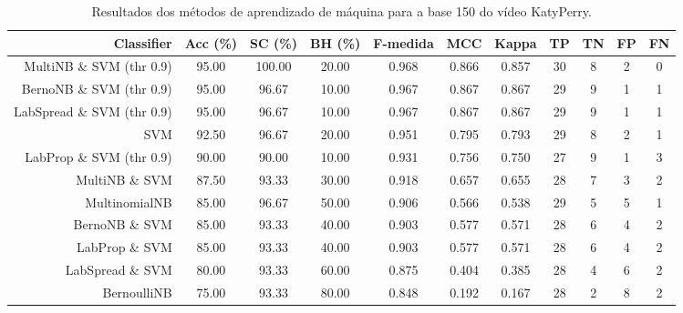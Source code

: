 \begin{table}[!htb]
\centering
\caption{Resultados dos métodos de aprendizado de máquina para a base 150 do vídeo KatyPerry.}
\label{tab:KatyPerry-150}
\begin{tabular}{r|c|c|c|c|c|c|c|c|c|c}
\hline\hline
Classifier & Acc (\%) & SC (\%) & BH (\%) & F-medida & MCC & Kappa & TP & TN & FP & FN \\ \hline
MultiNB \& SVM (thr 0.9) & 95.00 & 100.00 & 20.00 & 0.968 & 0.866 & 0.857 & 30 & 8 & 2 & 0 \\ 
BernoNB \& SVM (thr 0.9) & 95.00 & 96.67 & 10.00 & 0.967 & 0.867 & 0.867 & 29 & 9 & 1 & 1 \\ 
LabSpread \& SVM (thr 0.9) & 95.00 & 96.67 & 10.00 & 0.967 & 0.867 & 0.867 & 29 & 9 & 1 & 1 \\ 
SVM & 92.50 & 96.67 & 20.00 & 0.951 & 0.795 & 0.793 & 29 & 8 & 2 & 1 \\ 
LabProp \& SVM (thr 0.9) & 90.00 & 90.00 & 10.00 & 0.931 & 0.756 & 0.750 & 27 & 9 & 1 & 3 \\ 
MultiNB \& SVM & 87.50 & 93.33 & 30.00 & 0.918 & 0.657 & 0.655 & 28 & 7 & 3 & 2 \\ 
MultinomialNB & 85.00 & 96.67 & 50.00 & 0.906 & 0.566 & 0.538 & 29 & 5 & 5 & 1 \\ 
BernoNB \& SVM & 85.00 & 93.33 & 40.00 & 0.903 & 0.577 & 0.571 & 28 & 6 & 4 & 2 \\ 
LabProp \& SVM & 85.00 & 93.33 & 40.00 & 0.903 & 0.577 & 0.571 & 28 & 6 & 4 & 2 \\ 
LabSpread \& SVM & 80.00 & 93.33 & 60.00 & 0.875 & 0.404 & 0.385 & 28 & 4 & 6 & 2 \\ 
BernoulliNB & 75.00 & 93.33 & 80.00 & 0.848 & 0.192 & 0.167 & 28 & 2 & 8 & 2 \\ 
\hline\hline
\end{tabular}
\end{table}
